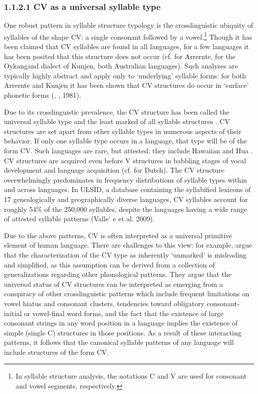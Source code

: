 \subsubsection{\textbf{1.1.2.1} \textbf{CV} \textbf{as} \textbf{a} \textbf{universal} \textbf{syllable} \textbf{type}}

\textsf{} One robust pattern in syllable structure typology is the crosslinguistic ubiquity of syllables of the shape CV: a single consonant followed by a vowel.\footnote{ \textrm{In syllable structure analysis, the notations C and V are used for consonant and vowel segments, respectively.}} Though it has been claimed that CV syllables are found in all languages, for a few languages it has been posited that this structure does not occur (cf. \citealt{BreenPensalfini1999} for Arrernte, \citealt{Sommer1969} for the Oykangand dialect of Kunjen, both Australian languages). Such analyses are typically highly abstract and apply only to ‘underlying’ syllable forms: for both Arrernte and Kunjen it has been shown that CV structures do occur in ‘surface’ phonetic forms (\citealt{Anderson2000}, \citealt{Sommer1969}, 1981).

  Due to its crosslinguistic prevalence, the CV structure has been called the universal syllable type and the least marked of all syllable structures \citep{Zec2007}. CV structures are set apart from other syllable types in numerous aspects of their behavior. If only one syllable type occurs in a language, that type will be of the form CV. Such languages are rare, but attested: they include Hawaiian \citep{Maddieson2011} and Hua \citep{Blevins1995}. CV structures are acquired even before V structures in babbling stages of vocal development and language acquisition (cf. \citealt{LeveltEtAl2000} for Dutch). The CV structure overwhelmingly predominates in frequency distributions of syllable types within and across languages. In ULSID, a database containing the syllabified lexicons of 17 genealogically and geographically diverse languages, CV syllables account for roughly 54\% of the 250,000 syllables, despite the languages having a wide range of attested syllable patterns (Valle\'{} e et al. 2009).

  Due to the above patterns, CV is often interpreted as a universal primitive element of human language. There are challenges to this view: for example, \citet{BellHooper1978} argue that the characterization of the CV type as inherently ‘unmarked’ is misleading and simplified, as this assumption can be derived from a collection of generalizations regarding other phonological patterns. They argue that the universal status of CV structures can be interpreted as emerging from a conspiracy of other crosslinguistic patterns which include frequent limitations on vowel hiatus and consonant clusters, tendencies toward obligatory consonant-initial or vowel-final word forms, and the fact that the existence of large consonant strings in any word position in a language implies the existence of simple (single C) structures in those positions. As a result of these interacting patterns, it follows that the canonical syllable patterns of any language will include structures of the form CV.

